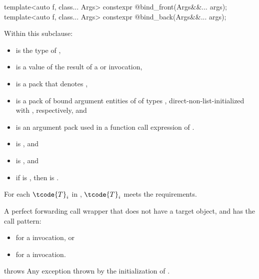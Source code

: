 %
%
\begin{itemdecl}
template<auto f, class... Args>
  constexpr @\unspec@ bind_front(Args&&... args);
template<auto f, class... Args>
  constexpr @\unspec@ bind_back(Args&&... args);
\end{itemdecl}

\begin{itemdescr}
\pnum
Within this subclause:
\begin{itemize}
\item
{} is the type of ,
\item
{} is a value of the result of
a  or  invocation,
\item
{} is a pack that denotes ,
\item
{} is a pack of bound argument entities of
 of types ,
direct-non-list-initialized with ,
respectively, and
\item
{} is an argument pack used in
a function call expression of .
\end{itemize}

\pnum
\mandates
\begin{itemize}
\item
{} is , and
\item
{} is , and
\item
if  is ,
then  is .
\end{itemize}

\pnum
\expects
For each $\tcode{T}_i$ in ,
$\tcode{T}_i$ meets the  requirements.

\pnum
\returns
A perfect forwarding call wrapper  that
does not have a target object, and has the call pattern:
\begin{itemize}
\item
{}
for a  invocation, or
\item
{}
for a  invocation.
\end{itemize}

\pnum
throws
Any exception thrown by the initialization of .
\end{itemdescr}

